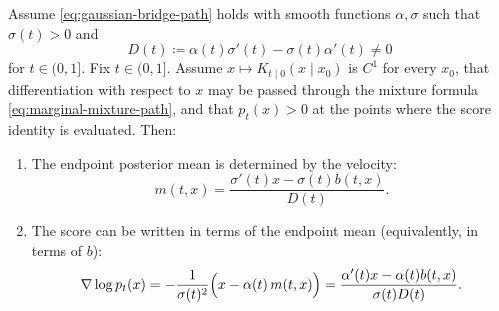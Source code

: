 \begin{proposition}
\label{prop:score-from-endpoint-mean}
Assume \eqref{eq:gaussian-bridge-path} holds with smooth functions \(\alpha,\sigma\) such that \(\sigma(t)>0\) and
\[
  D(t)\coloneqq \alpha(t)\sigma'(t)-\sigma(t)\alpha'(t)\neq 0
\]
for \(t\in(0,1]\).
Fix \(t\in(0,1]\).
Assume \(x\mapsto K_{t\mid 0}(x\mid x_0)\) is \(C^1\) for every \(x_0\), that differentiation with respect to \(x\) may be passed through the mixture formula \eqref{eq:marginal-mixture-path}, and that \(p_t(x)>0\) at the points where the score identity is evaluated.
Then:
\begin{enumerate}[leftmargin=*]
  \item The endpoint posterior mean is determined by the velocity:
  \begin{equation}
    m(t,x) = \frac{\sigma'(t)x-\sigma(t)b(t,x)}{D(t)}.
    \label{eq:endpoint-mean-from-velocity}
  \end{equation}
  \item The score can be written in terms of the endpoint mean (equivalently, in terms of \(b\)):
  \begin{equation}
    \nabla\log p_t(x)
    =
    -\frac{1}{\sigma(t)^2}\Bigl(x-\alpha(t)\,m(t,x)\Bigr)
    =
    \frac{\alpha'(t)x-\alpha(t)b(t,x)}{\sigma(t)D(t)}.
    \label{eq:score-from-endpoint-mean}
  \end{equation}
\end{enumerate}
\end{proposition}
